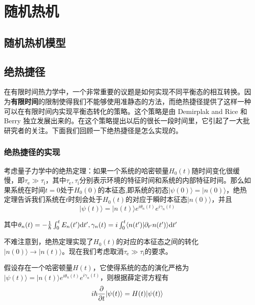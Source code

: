 \chapter{随机热机}
\label{cha2}


\section{随机热机模型}

\section{绝热捷径}

\qquad 在有限时间热力学中，一个非常重要的议题是如何实现不同平衡态的相互转换。因为\textbf{有限时间}的限制使得我们不能够使用准静态的方法，而绝热捷径\cite{Chen2010}提供了这样一种可以在有限时间内实现平衡态转化的策略。这个策略是由 Demirplak and Rice \cite{Demirplak2003}和 Berry \cite{Berry2009} 独立发展出来的。在这个策略提出以后的很长一段时间里，它引起了一大批研究者的关注。下面我们回顾一下绝热捷径是怎么实现的。


\subsection{绝热捷径的实现}


\qquad 考虑量子力学中的绝热定理\cite{Griffiths2018}：如果一个系统的哈密顿量$H_0(t)$随时间变化很缓慢，即$\tau_\mathrm{e} \gg \tau_\mathrm{i}$，其中$\tau_\mathrm{e}, \tau_\mathrm{i}$分别表示环境的特征时间和系统的内部特征时间。那么如果系统在时间$t=0$处于$H_0 (0)$的本征态,即系统的初态$| \psi(0) \rangle = | n(0) \rangle$，绝热定理告诉我们系统在$t$时刻会处于$H_0 (t)$的对应于瞬时本征态$| n(0) \rangle$，并且
\begin{equation}
    |\psi(t)\rangle=|n(t)\rangle e^{i \theta_{n}(t)} e^{i \gamma_{n}(t)}
    \label{eq2.1}
\end{equation}

其中$\theta_{n}(t)=-\frac{1}{\hbar} \int_{0}^{t} E_{n}(t^{\prime}) \mathrm{d} t^{\prime}, \gamma_{n}(t)=i \int_{0}^{t}\langle n(t^{\prime}) | \partial_{t^{\prime}}n(t^{\prime})\rangle \mathrm{d} t^{\prime}$

不难注意到，绝热定理实现了$H_0(t)$的对应的本征态之间的转化$| n(0) \rangle \to | n(t) \rangle$。现在我们考虑取消$\tau_\mathrm{e} \gg \tau_\mathrm{i}$的要求。

假设存在一个哈密顿量$H(t)$，它使得系统的态的演化严格为$|\psi(t)\rangle=|n(t)\rangle e^{i \theta_{n}(t)} e^{i \gamma_{n}(t)}$，则根据薛定谔方程有
\begin{equation}
    i \hbar \frac{\partial }{\partial t} |\psi(t)\rangle= H(t) |\psi(t)\rangle
    \label{eq2.2}
\end{equation}

